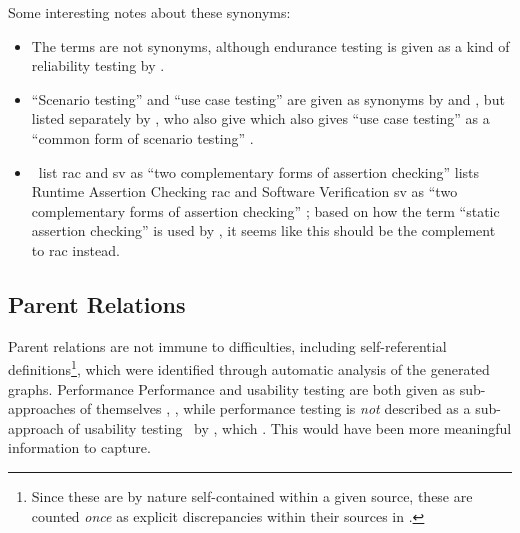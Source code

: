 \ifnotpaper
      Some interesting notes about these synonyms:
      \begin{itemize}
            \item The terms are not synonyms, although endurance testing is given
                  as a kind of reliability testing by \citet[p.~55]{Firesmith2015}.
            \item ``Scenario testing'' and ``use case testing'' are given as synonyms
                  by \citetISTQB{} and \citet[pp.~47-49]{Kam2008}, but listed
                  separately by \citet[p.~22]{IEEE2022},
                  \ifnotpaper who also give \else which also gives \fi ``use case
                  testing'' as a ``common form of scenario testing''
                  \citeyearpar[p.~20]{IEEE2021}.
            \item \ifnotpaper
                        \citeauthor{ChalinEtAl2006}~list \acf{rac} and \acf{sv} as ``two
                        complementary forms of assertion checking''
                        \citeyearpar[p.~343]{ChalinEtAl2006}%
                  \else
                        \cite[p.~343]{ChalinEtAl2006} lists Runtime Assertion
                        Checking \acf{rac} and Software Verification \acf{sv} as
                        ``two complementary forms of assertion checking''%
                  \fi; based on how the term ``static
                  assertion checking'' is used by \citet[p.~345]{LahiriEtAl2013}, it
                  seems like this should be the complement to \acs{rac} instead.
      \end{itemize}
\fi

\subsection{Parent Relations}
\label{par-rels}

Parent relations are not immune to difficulties, including self-referential
definitions\footnote{Since these are by nature self-contained within a given
      source, these are counted \emph{once} as explicit discrepancies within
      their sources in .}, which were identified
through automatic analysis of the generated graphs.
\ifnotpaper  Performance
\else Performance and usability testing are both given as sub-approaches of
      themselves \cite[Tab.~1]{Gerrard2000b}, \cite[Tab.~2]{Gerrard2000a},
      while performance \fi
testing is \emph{not} described as a sub-approach of usability testing%
\ifnotpaper\ by \citep{Gerrard2000a, Gerrard2000b}, which \else. This
\fi would have been more meaningful information to capture.

